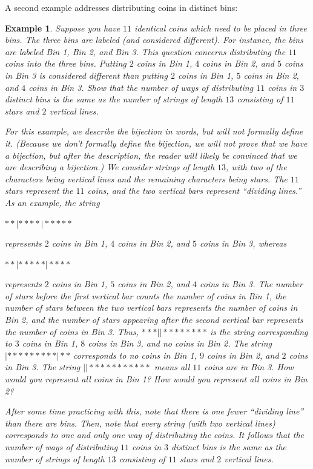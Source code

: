 \documentclass{book}
\newcounter{ekcounter}%
\theoremstyle{ekimcustom}
\newtheorem{example}[ekcounter]{Example}
\begin{document}
A second example addresses distributing coins in distinct bins:
\begin{example}
Suppose you have $11$ identical coins which need to be placed in three bins. The three bins are labeled (and considered different). For instance, the bins are labeled Bin 1, Bin 2, and Bin 3. This question concerns distributing the $11$ coins into the three bins. Putting $2$ coins in Bin 1, $4$ coins in Bin 2, and $5$ coins in Bin 3 is considered different than putting $2$ coins in Bin 1, $5$ coins in Bin 2, and $4$ coins in Bin 3. Show that the number of ways of distributing $11$ coins in $3$ distinct bins is the same as the number of strings of length $13$ consisting of $11$ stars and $2$ vertical lines.

For this example, we describe the bijection in words, but will not formally define it. (Because we don't formally define the bijection, we will not prove that we have a bijection, but after the description, the reader will likely be convinced that we are describing a bijection.) We consider strings of length $13$, with two of the characters being vertical lines and the remaining characters being stars. The $11$ stars represent the $11$ coins, and the two vertical bars represent ``dividing lines.'' As an example, the string
\begin{center}
$**|****|*****$
\end{center}
represents $2$ coins in Bin 1, $4$ coins in Bin 2, and $5$ coins in Bin 3, whereas
\begin{center}
$**|*****|****$
\end{center}
represents $2$ coins in Bin 1, $5$ coins in Bin 2, and $4$ coins in Bin 3. The number of stars before the first vertical bar counts the number of coins in Bin 1, the number of stars between the two vertical bars represents the number of coins in Bin 2, and the number of stars appearing after the second vertical bar represents the number of coins in Bin 3. Thus, $***||********$ is the string corresponding to $3$ coins in Bin 1, $8$ coins in Bin 3, and no coins in Bin 2. The string $|*********|**$ corresponds to no coins in Bin 1, $9$ coins in Bin 2, and $2$ coins in Bin 3. The string $||***********$ means all $11$ coins are in Bin 3. How would you represent all coins in Bin 1? How would you represent all coins in Bin 2?

After some time practicing with this, note that there is one fewer ``dividing line'' than there are bins. Then, note that every string (with two vertical lines) corresponds to one and only one way of distributing the coins. It follows that the number of ways of distributing $11$ coins in $3$ distinct bins is the same as the number of strings of length $13$ consisting of $11$ stars and $2$ vertical lines.
\end{example}
\end{document}
